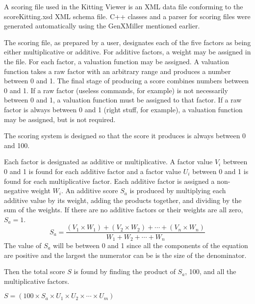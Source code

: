 A scoring file used in the Kitting Viewer is an XML data file conforming to
the scoreKitting.xsd XML schema file. C++ classes and a parser for scoring
files were generated automatically using the GenXMiller mentioned earlier.

The scoring file, as prepared by a user, designates each of the five
factors as being either multiplicative or additive. For additive factors, a
weight may be assigned in the file. For each factor, a valuation function
may be assigned. A valuation function takes a raw factor with an arbitrary
range and produces a number between 0 and 1. The final stage of producing
a score combines numbers between 0 and 1. If a raw factor (useless
commands, for example) is not necessarily between 0 and 1, a valuation
function must be assigned to that factor. If a raw factor is always between
0 and 1 (right stuff, for example), a valuation function may be assigned,
but is not required.

The scoring system is designed so that the score it produces is always
between 0 and 100.

Each factor is designated as additive or multiplicative. A factor
value $V_i$ between 0 and 1 is found for each additive factor and a
factor value $U_i$ between 0 and 1 is found for each multiplicative
factor. Each additive factor is assigned a non-negative weight $W_i$. An
additive score $S_a$ is produced by multiplying each additive value by
its weight, adding the products together, and dividing by the sum of the
weights. If there are no additive factors or their weights are all
zero, $S_a = 1$.
\[
S_a = \frac{(V_1\times W_1)+(V_2\times W_2)+\cdots + (V_n\times W_n)}{W_1+W_2+\cdots+W_n}
\]
The value of $S_a$ will be between 0 and 1 since all the components of the
equation are positive and the largest the numerator can be is the size
of the denominator.

Then the total score $S$ is found by finding the product of $S_a$, 100, and
all the multiplicative factors.

$S = (100\times S_a\times U_1\times U_2\times\cdots \times U_m)$



